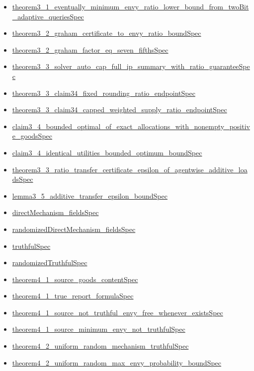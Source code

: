 \documentclass[10pt]{article}
\begin{document}
\begin{itemize}[leftmargin=1.2em]
\begin{itemize}[leftmargin=1.2em]
\item \hyperlink{source-claim-8bf4d9c1af9dd508}{theorem3\_1\_eventually\_minimum\_envy\_ratio\_lower\_bound\_from\_twoBit\_adaptive\_queriesSpec}
\item \hyperlink{source-claim-c0ef61df051381e6}{theorem3\_2\_graham\_certificate\_to\_envy\_ratio\_boundSpec}
\item \hyperlink{source-claim-c5095878a67ee745}{theorem3\_2\_graham\_factor\_eq\_seven\_fifthsSpec}
\item \hyperlink{source-claim-c094e7d861709ddc}{theorem3\_3\_solver\_auto\_cap\_full\_ip\_summary\_with\_ratio\_guaranteeSpec}
\item \hyperlink{source-claim-d452afafcd482e19}{theorem3\_3\_claim34\_fixed\_rounding\_ratio\_endpointSpec}
\item \hyperlink{source-claim-b87e6866c2239b5c}{theorem3\_3\_claim34\_capped\_weighted\_supply\_ratio\_endpointSpec}
\item \hyperlink{source-claim-8d75c815e22f5d1b}{claim3\_4\_bounded\_optimal\_of\_exact\_allocations\_with\_nonempty\_positive\_goodsSpec}
\item \hyperlink{source-claim-47e5534cdf1bff13}{claim3\_4\_identical\_utilities\_bounded\_optimum\_boundSpec}
\item \hyperlink{source-claim-d5233a0704a90fbf}{theorem3\_3\_ratio\_transfer\_certificate\_epsilon\_of\_agentwise\_additive\_loadsSpec}
\item \hyperlink{source-claim-fa0da40259a9d26f}{lemma3\_5\_additive\_transfer\_epsilon\_boundSpec}
\item \hyperlink{source-claim-069877ce7f94a642}{directMechanism\_fieldsSpec}
\item \hyperlink{source-claim-250a99e88b7ae2ef}{randomizedDirectMechanism\_fieldsSpec}
\item \hyperlink{source-claim-dde6f174675622fe}{truthfulSpec}
\item \hyperlink{source-claim-5fb3f82f1adf7c6f}{randomizedTruthfulSpec}
\item \hyperlink{source-claim-b506d5d8b67ab084}{theorem4\_1\_source\_goods\_contentSpec}
\item \hyperlink{source-claim-94cdbf2e279855ef}{theorem4\_1\_true\_report\_formulaSpec}
\item \hyperlink{source-claim-87600c3a3d619cbf}{theorem4\_1\_source\_not\_truthful\_envy\_free\_whenever\_existsSpec}
\item \hyperlink{source-claim-b1ad798761a4903c}{theorem4\_1\_source\_minimum\_envy\_not\_truthfulSpec}
\item \hyperlink{source-claim-41e9057437421225}{theorem4\_2\_uniform\_random\_mechanism\_truthfulSpec}
\item \hyperlink{source-claim-1bcf19126f2645bf}{theorem4\_2\_uniform\_random\_max\_envy\_probability\_boundSpec}
\end{itemize}
\end{itemize}
\end{document}
